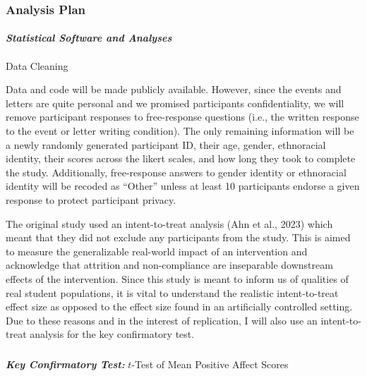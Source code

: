 \documentclass[
  letterpaper,
  DIV=11,
  numbers=noendperiod]{scrartcl}
\makeatletter
\let\oldparagraph\paragraph
\renewcommand{\paragraph}{
    \@ifstar
      \xxxParagraphStar
      \xxxParagraphNoStar
  }
\newcommand{\xxxParagraphStar}[1]{\oldparagraph*{#1}\mbox{}}
\newcommand{\xxxParagraphNoStar}[1]{\oldparagraph{#1}\mbox{}}
\let\oldsubparagraph\subparagraph
\renewcommand{\subparagraph}{
    \@ifstar
      \xxxSubParagraphStar
      \xxxSubParagraphNoStar
  }
\newcommand{\xxxSubParagraphStar}[1]{\oldsubparagraph*{#1}\mbox{}}
\newcommand{\xxxSubParagraphNoStar}[1]{\oldsubparagraph{#1}\mbox{}}
\makeatother
\begin{document}
\subsubsection{Analysis Plan}\label{analysis-plan}

\paragraph{\texorpdfstring{\textbf{\emph{Statistical Software and
Analyses}}}{Statistical Software and Analyses}}\label{statistical-software-and-analyses}

\paragraph{Data Cleaning}\label{data-cleaning}

Data and code will be made publicly available. However, since the events
and letters are quite personal and we promised participants
confidentiality, we will remove participant responses to free-response
questions (i.e., the written response to the event or letter writing
condition). The only remaining information will be a newly randomly
generated participant ID, their age, gender, ethnoracial identity, their
scores across the likert scales, and how long they took to complete the
study. Additionally, free-response answers to gender identity or
ethnoracial identity will be recoded as ``Other'' unless at least 10
participants endorse a given response to protect participant privacy.

The original study used an intent-to-treat analysis (Ahn et al., 2023)
which meant that they did not exclude any participants from the study.
This is aimed to measure the generalizable real-world impact of an
intervention and acknowledge that attrition and non-compliance are
inseparable downstream effects of the intervention. Since this study is
meant to inform us of qualities of real student populations, it is vital
to understand the realistic intent-to-treat effect size as opposed to
the effect size found in an artificially controlled setting. Due to
these reasons and in the interest of replication, I will also use an
intent-to-treat analysis for the key confirmatory test.

\subparagraph{\texorpdfstring{\textbf{\emph{Key Confirmatory Test:}}
\(t\)-Test of Mean Positive Affect
Scores}{Key Confirmatory Test: t-Test of Mean Positive Affect Scores}}\label{key-confirmatory-test-t-test-of-mean-positive-affect-scores}
\end{document}
